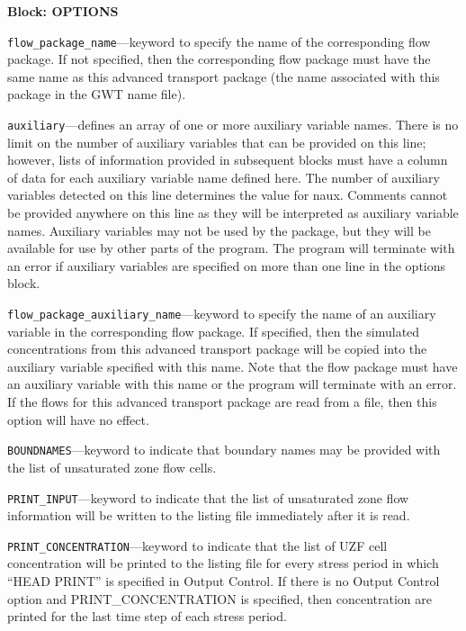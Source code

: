 
\item \textbf{Block: OPTIONS}

\begin{description}
\item \texttt{flow\_package\_name}---keyword to specify the name of the corresponding flow package.  If not specified, then the corresponding flow package must have the same name as this advanced transport package (the name associated with this package in the GWT name file).

\item \texttt{auxiliary}---defines an array of one or more auxiliary variable names.  There is no limit on the number of auxiliary variables that can be provided on this line; however, lists of information provided in subsequent blocks must have a column of data for each auxiliary variable name defined here.   The number of auxiliary variables detected on this line determines the value for naux.  Comments cannot be provided anywhere on this line as they will be interpreted as auxiliary variable names.  Auxiliary variables may not be used by the package, but they will be available for use by other parts of the program.  The program will terminate with an error if auxiliary variables are specified on more than one line in the options block.

\item \texttt{flow\_package\_auxiliary\_name}---keyword to specify the name of an auxiliary variable in the corresponding flow package.  If specified, then the simulated concentrations from this advanced transport package will be copied into the auxiliary variable specified with this name.  Note that the flow package must have an auxiliary variable with this name or the program will terminate with an error.  If the flows for this advanced transport package are read from a file, then this option will have no effect.

\item \texttt{BOUNDNAMES}---keyword to indicate that boundary names may be provided with the list of unsaturated zone flow cells.

\item \texttt{PRINT\_INPUT}---keyword to indicate that the list of unsaturated zone flow information will be written to the listing file immediately after it is read.

\item \texttt{PRINT\_CONCENTRATION}---keyword to indicate that the list of UZF cell concentration will be printed to the listing file for every stress period in which ``HEAD PRINT'' is specified in Output Control.  If there is no Output Control option and PRINT\_CONCENTRATION is specified, then concentration are printed for the last time step of each stress period.


\end{description}
